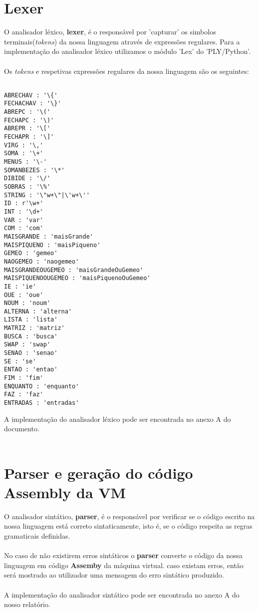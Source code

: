 \documentclass[11pt,a4paper]{report}%
\begin{document}
\newpage

\section{Lexer}
O analisador léxico, \textbf{lexer}, é o responsável por 'capturar' os simbolos terminais(\textit{tokens}) da nossa linguagem através de expressões regulares. Para a implementação do analisador léxico utilizamos o módulo 'Lex' do 'PLY/Python'.\\ \\
Os \textit{tokens} e respetivas expressões regulares da nossa linguagem são os seguintes:

\begin{verbatim}

ABRECHAV : '\{'
FECHACHAV : '\}'
ABREPC : '\('
FECHAPC : '\)'
ABREPR : '\['
FECHAPR : '\]'
VIRG : '\,'
SOMA : '\+'
MENUS : '\-'
SOMANBEZES : '\*'
DIBIDE : '\/'
SOBRAS : '\%'
STRING : '\"w+\"|\'w+\''
ID : r'\w+'
INT : '\d+'
VAR : 'var'
COM : 'com'
MAISGRANDE : 'maisGrande'
MAISPIQUENO : 'maisPiqueno'
GEMEO : 'gemeo'
NAOGEMEO : 'naogemeo'
MAISGRANDEOUGEMEO : 'maisGrandeOuGemeo'
MAISPIQUENOOUGEMEO : 'maisPiquenoOuGemeo'
IE : 'ie'
OUE : 'oue'
NOUM : 'noum'
ALTERNA : 'alterna'
LISTA : 'lista'
MATRIZ : 'matriz'
BUSCA : 'busca'
SWAP : 'swap'
SENAO : 'senao'
SE : 'se'
ENTAO : 'entao'
FIM : 'fim'
ENQUANTO : 'enquanto'
FAZ : 'faz'
ENTRADAS : 'entradas'
\end{verbatim}

A implementação do analisador léxico pode ser encontrada no anexo A do documento. 
\\ \\


\section{Parser e geração do código Assembly da VM}
O analisador sintático, \textbf{parser}, é  o responsável por verificar se o código escrito na nossa linguagem está correto sintaticamente, isto é, se  o código respeita as regras gramaticais definidas. \\ \\

No caso de não existirem erros sintáticos o \textbf{parser} converte o código da nossa linguagem em código \textbf{Assemby} da máquina virtual. caso existam erros, então será mostrado ao utilizador uma mensagem do erro sintático produzido. \\ \\
A implementação do analisador sintático pode ser encontrada no anexo A do nosso relatório.
\end{document}
